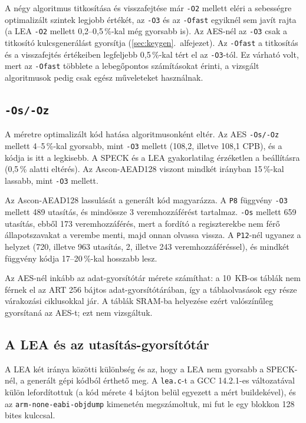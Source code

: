 \documentclass[a4paper,12pt]{report}
\theoremstyle{definition}
\theoremstyle{remark}
\begin{document}
A négy algoritmus titkosítása és visszafejtése már \texttt{-O2} mellett eléri a sebességre optimalizált szintek legjobb értékét, az \texttt{-O3} és az \texttt{-Ofast} egyiknél sem javít rajta (a LEA \texttt{-O2} mellett 0,2--0,5\,\%-kal még gyorsabb is). Az AES-nél az \texttt{-O3} csak a titkosító kulcsgenerálást gyorsítja (\ref{sec:keygen}.~alfejezet). Az \texttt{-Ofast} a titkosítás és a visszafejtés értékeiben legfeljebb 0,5\,\%-kal tért el az \texttt{-O3}-tól. Ez várható volt, mert az \texttt{-Ofast} többlete a lebegőpontos számításokat érinti, a vizsgált algoritmusok pedig csak egész műveleteket használnak.

\subsection{\texttt{-Os/-Oz}}

A méretre optimalizált kód hatása algoritmusonként eltér. Az AES \texttt{-Os/-Oz} mellett 4--5\,\%-kal gyorsabb, mint \texttt{-O3} mellett (108,2, illetve 108,1 CPB), és a kódja is itt a legkisebb. A SPECK és a LEA gyakorlatilag érzéketlen a beállításra (0,5\,\% alatti eltérés). Az Ascon-AEAD128 viszont mindkét irányban 15\,\%-kal lassabb, mint \texttt{-O3} mellett.

Az Ascon-AEAD128 lassulását a generált kód magyarázza. A \texttt{P8} függvény \texttt{-O3} mellett 489 utasítás, és mindössze 3 veremhozzáférést tartalmaz. \texttt{-Os} mellett 659 utasítás, ebből 173 veremhozzáférés, mert a fordító a regiszterekbe nem férő állapotszavakat a verembe menti, majd onnan olvassa vissza. A \texttt{P12}-nél ugyanez a helyzet (720, illetve 963 utasítás, 2, illetve 243 veremhozzáféréssel), és mindkét függvény kódja 17--20\,\%-kal hosszabb lesz.

Az AES-nél inkább az adat-gyorsítótár mérete számíthat: a 10~KB-os táblák nem férnek el az ART 256 bájtos adat-gyorsítótárában, így a táblaolvasások egy része várakozási ciklusokkal jár. A táblák SRAM-ba helyezése ezért valószínűleg gyorsítaná az AES-t; ezt nem vizsgáltuk.

\subsection{A LEA és az utasítás-gyorsítótár}\label{sec:lea_asm}

A LEA két iránya közötti különbség és az, hogy a LEA nem gyorsabb a SPECK-nél, a generált gépi kódból érthető meg. A \texttt{lea.c}-t a GCC 14.2.1-es változatával külön lefordítottuk (a kód mérete 4 bájton belül egyezett a mért buildekével), és az \texttt{arm-none-eabi-objdump} kimenetén megszámoltuk, mi fut le egy blokkon 128 bites kulccsal.
\end{document}
